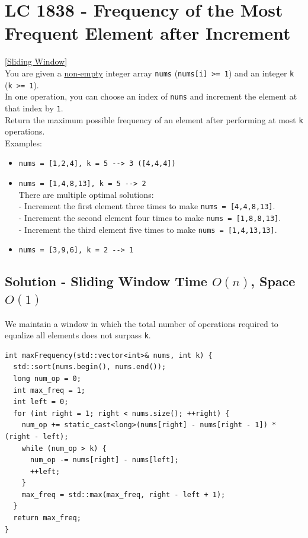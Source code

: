 \section{LC 1838 - Frequency of the Most Frequent Element after Increment}\label{lc1838}
{\hyperref[sec:sliding_window]{[Sliding Window]}}\\

You are given a \ul{non-empty} integer array {\colorbox{CodeBackground}{\lstinline|nums|}} ({\colorbox{CodeBackground}{\lstinline|nums[i] >= 1|}}) and an integer {\colorbox{CodeBackground}{\lstinline|k|}} ({\colorbox{CodeBackground}{\lstinline|k >= 1|}}). \\

In one operation, you can choose an index of {\colorbox{CodeBackground}{\lstinline|nums|}} and increment the element at that index by {\colorbox{CodeBackground}{\lstinline|1|}}.\\

Return the maximum possible frequency of an element after performing at most {\colorbox{CodeBackground}{\lstinline|k|}} operations.\\

Examples:
\begin{itemize}
\item {\colorbox{CodeBackground}{\lstinline|nums = [1,2,4], k = 5 --> 3 ([4,4,4])|}}
\item {\colorbox{CodeBackground}{\lstinline|nums = [1,4,8,13], k = 5 --> 2|}}\\
There are multiple optimal solutions:\\
- Increment the first element three times to make {\colorbox{CodeBackground}{\lstinline|nums = [4,4,8,13]|}}. \\
- Increment the second element four times to make {\colorbox{CodeBackground}{\lstinline|nums = [1,8,8,13]|}}. \\
- Increment the third element five times to make {\colorbox{CodeBackground}{\lstinline|nums = [1,4,13,13]|}}.
\item {\colorbox{CodeBackground}{\lstinline|nums = [3,9,6], k = 2 --> 1|}}
\end{itemize}

\subsection*{Solution - Sliding Window {\scriptsize\color{gray}\Coffeecup\hspace{1mm}Time $O(n)$, Space $O(1)$}}
We maintain a window in which the total number of operations required to equalize all elements does not surpass {\colorbox{CodeBackground}{\lstinline|k|}}.
\begin{lstlisting}
int maxFrequency(std::vector<int>& nums, int k) {
  std::sort(nums.begin(), nums.end());
  long num_op = 0;
  int max_freq = 1;
  int left = 0;
  for (int right = 1; right < nums.size(); ++right) {
    num_op += static_cast<long>(nums[right] - nums[right - 1]) * (right - left);
    while (num_op > k) {
      num_op -= nums[right] - nums[left];
      ++left;
    }
    max_freq = std::max(max_freq, right - left + 1);
  }
  return max_freq;
}
\end{lstlisting}

